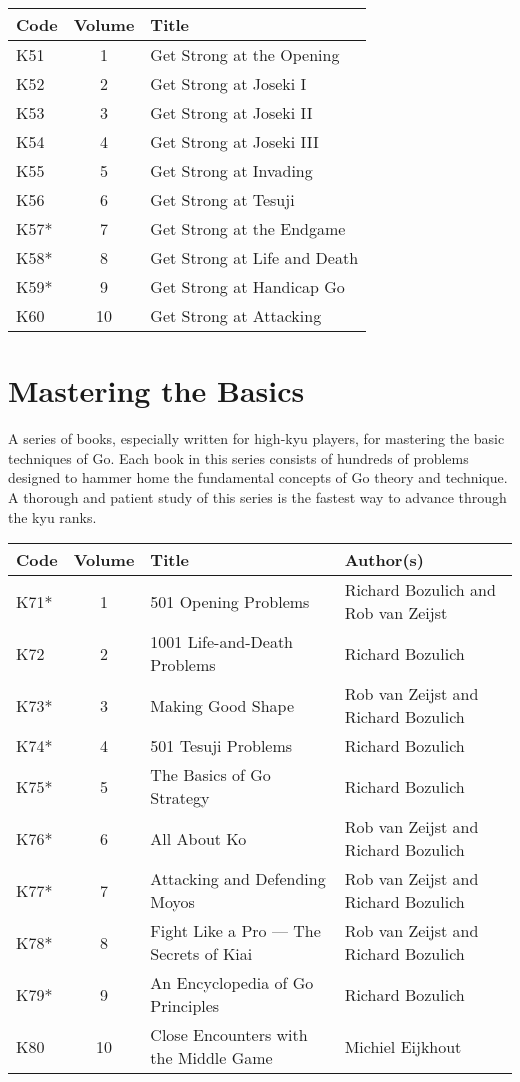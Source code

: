 \begin{longtable}{l|c|l} 
    \hline
    \textbf{Code} & \textbf{Volume} & \textbf{Title} \\
    \hline \hline
    K51 & 1 & Get Strong at the Opening \\
    \hline
    K52 & 2 & Get Strong at Joseki I \\
    \hline
    K53 & 3 & Get Strong at Joseki II \\
    \hline
    K54 & 4 & Get Strong at Joseki III \\
    \hline
    K55 & 5 & Get Strong at Invading \\
    \hline
    K56 & 6 & Get Strong at Tesuji \\
    \hline
    K57* & 7 & Get Strong at the Endgame \\
    \hline
    K58* & 8 & Get Strong at Life and Death \\
    \hline
    K59* & 9 & Get Strong at Handicap Go \\
    \hline
    K60 & 10 & Get Strong at Attacking \\
    \hline
\end{longtable}

\section{Mastering the Basics}

A series of books, especially written for high-kyu players, for mastering the basic techniques of Go. Each book in this series consists of hundreds of problems designed to hammer home the fundamental concepts of Go theory and technique. A thorough and patient study of this series is the fastest way to advance through the kyu ranks.

\begin{longtable}{l|c|p{55mm}|p{35mm}} 
    \hline
    \textbf{Code} & \textbf{Volume} & \textbf{Title} & \textbf{Author(s)} \\
    \hline \hline
    K71* & 1 & 501 Opening Problems & Richard Bozulich and Rob van Zeijst \\
    \hline
    K72 & 2 & 1001 Life-and-Death Problems & Richard Bozulich \\
    \hline
    K73* & 3 & Making Good Shape & Rob van Zeijst and Richard Bozulich \\
    \hline
    K74* & 4 & 501 Tesuji Problems & Richard Bozulich \\
    \hline
    K75* & 5 & The Basics of Go Strategy & Richard Bozulich \\
    \hline
    K76* & 6 & All About Ko & Rob van Zeijst and Richard Bozulich \\
    \hline
    K77* & 7 & Attacking and Defending Moyos & Rob van Zeijst and Richard Bozulich \\
    \hline
    K78* & 8 & Fight Like a Pro --- The Secrets of Kiai & Rob van Zeijst and Richard Bozulich \\
    \hline
    K79* & 9 & An Encyclopedia of Go Principles & Richard Bozulich \\
    \hline
    K80 & 10 & Close Encounters with the Middle Game & Michiel Eijkhout \\
    \hline
\end{longtable}

